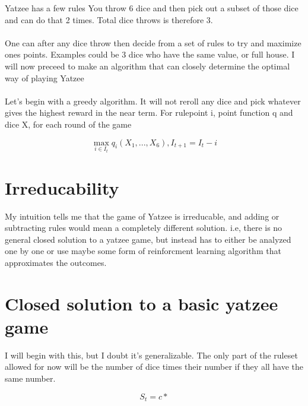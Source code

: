 \documentclass[a4paper,12pt]{article}
\begin{document}
Yatzee has a few rules
You throw 6 dice and then pick out a subset of those dice and can do that
2 times. Total dice throws is therefore 3.

\paragraph{}
One can after any dice throw then decide from a set of rules to try and maximize
ones points. Examples could be 3 dice who have the same value, or full house. I will
now preceed to make an algorithm that can closely determine the optimal way of playing
Yatzee

\paragraph{}
Let's begin with a greedy algorithm. It will not reroll any dice and pick whatever gives
the highest reward in the near term. For rulepoint i, point function q and dice X,
for each round of the game

$$\max_{i\in I_t} q_i({X_1,...,X_6}), I_{t+1} = I_t - i$$




\section{Irreducability}

My intuition tells me that the game of Yatzee is irreducable, and adding
or subtracting rules would mean a completely different solution. i.e, there is
no general closed solution to a yatzee game, but instead has to either be analyzed
one by one or use maybe some form of reinforcment learning algorithm that
approximates the outcomes.

\section{Closed solution to a basic yatzee game}

I will begin with this, but I doubt it's generalizable. The only part
of the ruleset allowed for now will be the number of dice times their number
if they all have the same number.

$$S_t = c*$$
\end{document}

